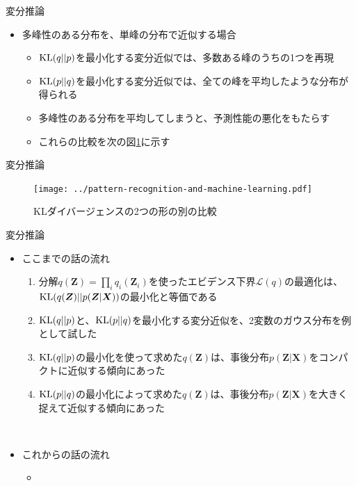 \documentclass[dvipdfmx,notheorems,t]{beamer}
\begin{document}
\begin{frame}{変分推論}

\begin{itemize}
	\item 多峰性のある分布を、単峰の分布で近似する場合
	\begin{itemize}
		\item $\operatorname{KL}(q || p)$を最小化する変分近似では、\alert{多数ある峰のうちの1つ}を再現
		\item $\operatorname{KL}(p || q)$を最小化する変分近似では、\alert{全ての峰を平均したような分布}が得られる
		\newline
		\item 多峰性のある分布を平均してしまうと、\alert{予測性能の悪化}をもたらす
		\newline
		\item これらの比較を次の図\ref{fig:comparison-between-kl-divergence-2}に示す
	\end{itemize}
\end{itemize}

\end{frame}

\begin{frame}{変分推論}

\begin{figure}[h]
	\centering
	\texttt{[image: ../pattern-recognition-and-machine-learning.pdf]}
	\caption{KLダイバージェンスの2つの形の別の比較}
	\label{fig:comparison-between-kl-divergence-2}
\end{figure}

\end{frame}

\begin{frame}{変分推論}

\begin{itemize}
	\item ここまでの話の流れ
	\begin{enumerate}
		\item 分解$q(\bm{Z}) = \prod_i q_i(\bm{Z}_i)$を使ったエビデンス下界$\mathcal{L}(q)$の最適化は、$\operatorname{KL}(q(\bm{Z}) || p(\bm{Z} | \bm{X}))$の最小化と等価である
		\newline
		\item $\operatorname{KL}(q || p)$と、$\operatorname{KL}(p || q)$を最小化する変分近似を、2変数のガウス分布を例として試した
		\newline
		\item $\operatorname{KL}(q || p)$の最小化を使って求めた$q(\bm{Z})$は、事後分布$p(\bm{Z} | \bm{X})$を\alert{コンパクトに近似}する傾向にあった
		\newline
		\item $\operatorname{KL}(p || q)$の最小化によって求めた$q(\bm{Z})$は、事後分布$p(\bm{Z} | \bm{X})$を\alert{大きく捉えて近似}する傾向にあった
	\end{enumerate} \
	
	\item これからの話の流れ
	\begin{itemize}
		\item %
	\end{itemize}
\end{itemize}

\end{frame}
\end{document}
